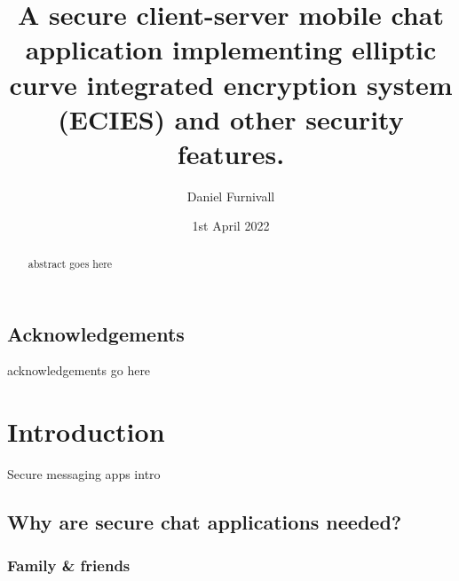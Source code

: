\documentclass{mproj}
\begin{document}

\title{A secure client-server mobile chat application implementing elliptic curve integrated encryption system (ECIES) and other security features.}
\author{Daniel Furnivall}
\date{1st April 2022}
\maketitle

\begin{abstract}
abstract goes here
\end{abstract}

\educationalconsent


\newpage
\section*{Acknowledgements}

acknowledgements go here

\tableofcontents


\chapter{Introduction}\label{intro} \setcounter{page}{1} 
Secure messaging apps intro

\section{Why are secure chat applications needed?}

\subsection{Family \& friends}
\end{document}
